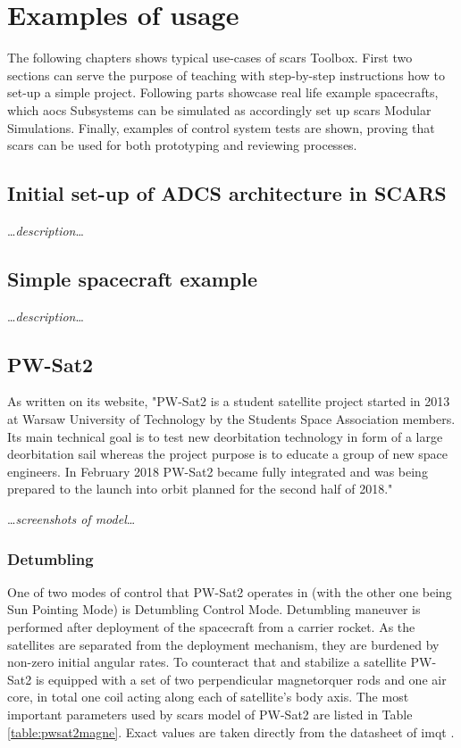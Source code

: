 \section{Examples of usage}\label{sec:examples}
    The following chapters shows typical use-cases of \ac{scars} Toolbox. First two sections can serve the purpose of teaching with step-by-step instructions how to set-up a simple project. Following parts showcase real life example spacecrafts, which \ac{aocs} Subsystems can be simulated as accordingly set up \ac{scars} Modular Simulations. Finally, examples of control system tests are shown, proving that \ac{scars} can be used for both prototyping and reviewing processes.

    \subsection{Initial set-up of ADCS architecture in SCARS}
        \dots\textit{description}\dots

    \subsection{Simple spacecraft example}
        \dots\textit{description}\dots

    \subsection{PW-Sat2}
        As written on its website, "PW-Sat2 is a student satellite project started in 2013 at Warsaw University of Technology by the Students Space Association members. Its main technical goal is to test new deorbitation technology in form of a large deorbitation sail whereas the project purpose is to educate a group of new space engineers. In February 2018 PW-Sat2 became fully integrated and was being prepared to the launch into orbit planned for the second half of 2018."\cite{pwsat2website}
        
        \dots\textit{screenshots of model}\dots

        \subsubsection{Detumbling}
            One of two modes of control that PW-Sat2 operates in (with the other one being Sun Pointing Mode) is Detumbling Control Mode. Detumbling maneuver is performed after deployment of the spacecraft from a carrier rocket. As the satellites are separated from the deployment mechanism, they are burdened by non-zero initial angular rates. To counteract that and stabilize a satellite PW-Sat2 is equipped with a set of two perpendicular magnetorquer rods and one air core, in total one coil acting along each of satellite's body axis. The most important parameters used by \ac{scars} model of PW-Sat2 are listed in Table \ref{table:pwsat2magne}.\cite{pwsat2adcs} Exact values are taken directly from the datasheet of \ac{imqt} \cite{imqt-datasheet}.

